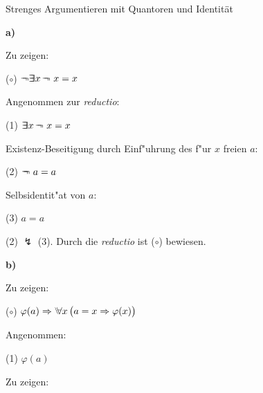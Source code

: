 \documentclass[a4paper,12pt]{scrartcl}
\newcommand{\Ex}{\Exists}
\begin{document}
 
\header

\begin{task}{Strenges Argumentieren mit Quantoren und Identität}

\textbf{a) }
\vspace{4pt}

Zu zeigen:

\vspace{2pt}
($\circ$) \hspace*{1em} $\Neg \Ex x \, \Neg \ x = x$

\vspace{2pt}
Angenommen zur \emph{reductio}: 

\vspace{2pt}
(1) \hspace*{1em} $\Ex x \, \Neg \ x = x$

\vspace{2pt}
Existenz-Beseitigung durch Einf"uhrung des f"ur $x$ freien $a$: 

\vspace{2pt}
(2) \hspace*{1em} $\neg\hspace*{-0.5em}\neg \ a = a$

\vspace{2pt}
Selbsidentit"at von $a$:

\vspace{2pt}
(3) \hspace*{1em} $a = a$

\vspace{10pt}
(2) $\lightning$ (3). Durch die \emph{reductio} ist ($\circ$) bewiesen.
\vspace{15pt}




\textbf{b) }
\vspace{4pt}

Zu zeigen:

\vspace{2pt}
($\circ$) \hspace*{1em} $\varphi(a) \Then \Forall x \, \big(a=x \Then \varphi(x)\big)$

\vspace{2pt}
Angenommen: 

\vspace{2pt}
(1) \hspace*{1em} $\varphi(a)$

\vspace{2pt}
Zu zeigen:


\end{task}
\end{document}
